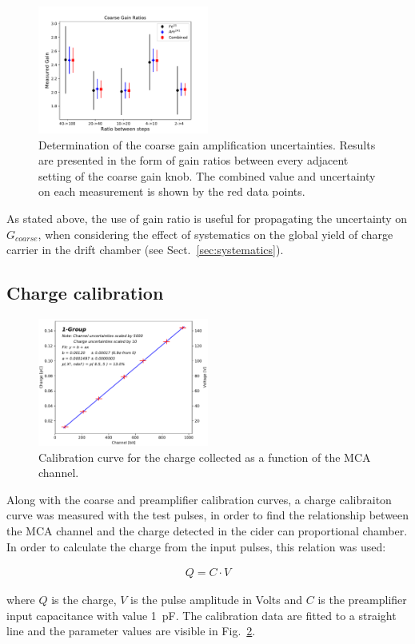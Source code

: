 \begin{figure}[htb]
  \includegraphics[width=0.5\textwidth]{graphics/coarse_gain_calibration.pdf}
  \caption{Determination of the coarse gain amplification uncertainties. Results are presented in the form of gain ratios between every adjacent setting of the coarse gain knob. The combined value and uncertainty on each measurement is shown by the red data points.}
  \label{fig:coarse_gain}
\end{figure}


As stated above, the use of gain ratio is useful for propagating the uncertainty on $G_{coarse}$, when considering the effect of systematics on the global yield of charge carrier in the drift chamber (see Sect.~\ref{sec:systematics}).

\subsection{Charge calibration}

\begin{figure}[htb]
  \includegraphics[width=0.5\textwidth]{graphics/chargevschannel.pdf}
  \caption{Calibration curve for the charge collected as a function of the MCA channel.}
  \label{fig:charge_calibration}
\end{figure}

Along with the coarse and preamplifier calibration curves, a charge calibraiton curve was measured with the test pulses, in order to find the relationship between the MCA channel and the charge detected in the cider can proportional chamber. In order to calculate the charge from the input pulses, this relation was used:

\begin{align}
Q = C \cdot V
\end{align}

where $Q$ is the charge, $V$ is the pulse amplitude in Volts and $C$ is the preamplifier input capacitance with value \SI{1}{pF}.
The calibration data are fitted to a straight line and the parameter values are visible in Fig.~\ref{fig:charge_calibration}.


